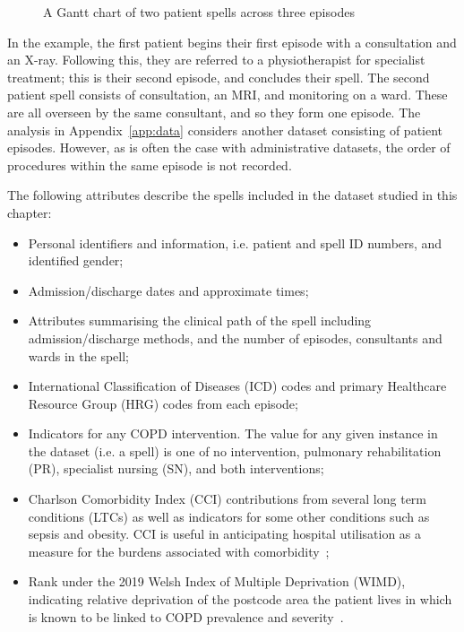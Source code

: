 \begin{figure}[htbp]
    \centering
    \resizebox{\imgwidth}{!}{%
        
    }
    \caption{A Gantt chart of two patient spells across three episodes}
    \label{fig:spell}
\end{figure}

In the example, the first patient begins their first episode with a consultation
and an X-ray. Following this, they are referred to a physiotherapist for
specialist treatment; this is their second episode, and concludes their spell.
The second patient spell consists of consultation, an MRI, and monitoring on a
ward. These are all overseen by the same consultant, and so they form one
episode. The analysis in Appendix~\ref{app:data} considers another dataset
consisting of patient episodes. However, as is often the case with
administrative datasets, the order of procedures within the same episode is not
recorded.

The following attributes describe the spells included in the dataset studied in
this chapter:

\begin{itemize}
    \item Personal identifiers and information, i.e. patient and spell ID
        numbers, and identified gender;
    \item Admission/discharge dates and approximate times;
    \item Attributes summarising the clinical path of the spell including
        admission/discharge methods, and the number of episodes, consultants and
        wards in the spell;
    \item International Classification of Diseases (ICD) codes and primary
        Healthcare Resource Group (HRG) codes from each episode;
    \item Indicators for any COPD intervention. The value for any given instance
        in the dataset (i.e. a spell) is one of no intervention, pulmonary
        rehabilitation (PR), specialist nursing (SN), and both interventions;
    \item Charlson Comorbidity Index (CCI) contributions from several long term
        conditions (LTCs) as well as indicators for some other conditions such
        as sepsis and obesity. CCI is useful in anticipating hospital
        utilisation as a measure for the burdens associated with
        comorbidity~\cite{Simon2011};
    \item Rank under the 2019 Welsh Index of Multiple Deprivation (WIMD),
        indicating relative deprivation of the postcode area the patient lives
        in which is known to be linked to COPD prevalence and
        severity~\cite{Collins2018,Sexton2016,Steiner2017}.
\end{itemize}

